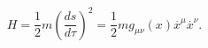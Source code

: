 \begin{equation}
H=\frac{1}{2}m\left( \frac{ds}{d\tau }\right) ^{2}=\frac{1}{2}mg_{\mu \nu
}(x)\stackrel{.}{x}^{\mu }\stackrel{.}{x}^{\nu }.
\end{equation}

